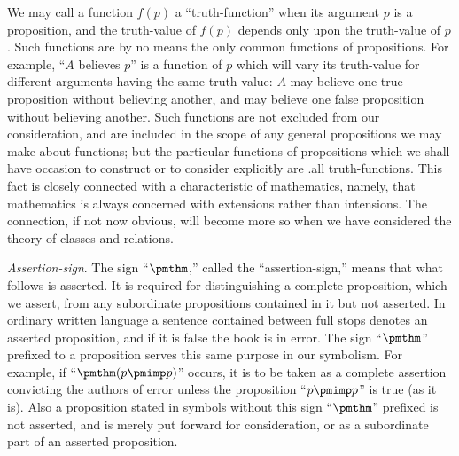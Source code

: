 \documentclass[letterpaper,12pt,openany,leqno]{book}
\newcommand{\pagefirst}[1]{\marginnote[\boxed{\text{#1}}]{\boxed{\text{#1}}}}
\begin{document}
We may call a function $f(p)$ a ``truth-function'' when its argument $p$ is a proposition, and the truth-value of $f(p)$ depends only upon the truth-value of $p$. Such functions are by no means the only common functions of propositions. For example, ``$A$ believes $p$'' is a function of $p$ which will vary its truth-value for different arguments having the same truth-value: $A$ may believe one true proposition without believing another, and may believe one false proposition without believing another. Such functions are not excluded from our consideration, and are included in the scope of any general propositions we may make about functions; but the particular functions of propositions which we shall have occasion to construct or to consider explicitly are .all truth-functions. This fact is closely connected with a characteristic of mathematics, namely, that mathematics is always concerned with extensions rather than intensions. The connection, if not now obvious,
will become more so when we have considered the theory of classes and relations.

\textit{Assertion-sign}. The sign ``$\pmthm$,'' called the ``assertion-sign,'' means that what follows is asserted. It is required for distinguishing a complete proposition, which we assert, from any subordinate propositions contained in it but \pagefirst{9} not asserted. In ordinary written language a sentence contained between full stops denotes an asserted proposition, and if it is false the book is in error. The sign ``$\pmthm$'' prefixed to a proposition serves this same purpose in our symbolism. For example, if ``$\pmthm (p \pmimp p)$'' occurs, it is to be taken as a complete assertion convicting the authors of error unless the proposition ``$p \pmimp p$'' is true (as it is). Also a proposition stated in symbols without this sign ``$\pmthm$'' prefixed is not asserted, and is merely put forward for consideration, or as a subordinate part of an asserted proposition.
\end{document}
